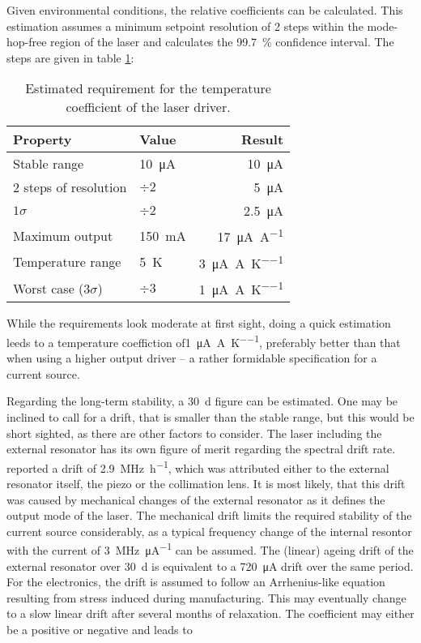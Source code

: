 Given environmental conditions, the relative coefficients can be calculated. This estimation assumes a minimum setpoint resolution of 2 steps within the mode-hop-free region of the laser and calculates the \qty{99.7}{\percent} confidence interval. The steps are given in table \ref{tab:dgdrive_tempco}:

\begin{table}[hb]
    \centering
    \begin{tabular}{llr}
        Property& Value& Result \\
        \midrule
        Stable range & \qty{10}{\uA}& \qty{10}{\uA}\\
        2 steps of resolution  & $\div 2$& \qty{5}{\uA} \\
        $1 \sigma$  & $\div 2$& \qty{2.5}{\uA} \\
        Maximum output& \qty{150}{\mA}& \qty{17}{\uA \per \A}\\
        Temperature range& \qty{5}{\K}& \qty{3}{\uA \per \A \per \K}\\
        Worst case ($3 \sigma$)& $\div 3$& \qty{1}{\uA \per \A \per \K}\\
    \end{tabular}
    \caption{Estimated requirement for the temperature coefficient of the laser driver.}
    \label{tab:dgdrive_tempco}
\end{table}

While the requirements look moderate at first sight, doing a quick estimation leeds to a temperature coeffiction of\qty[per-mode = symbol]{1}{\uA \per \A \per \K}, preferably better than that when using a higher output driver -- a rather formidable specification for a current source.

Regarding the long-term stability, a \qty{30}{\day} figure can be estimated. One may be inclined to call for a drift, that is smaller than the stable range, but this would be short sighted, as there are other factors to consider. The laser including the external resonator has its own figure of merit regarding the spectral drift rate. \citeauthor{ecdl_stability} \cite{ecdl_stability} reported a drift of \qty{2.9}{\MHz \per \hour}, which was attributed either to the external resonator itself, the piezo or the collimation lens. It is most likely, that this drift was caused by mechanical changes of the external resonator as it defines the output mode of the laser. The mechanical drift limits the required stability of the current source considerably, as a typical frequency change of the internal resontor with the current of \qty[per-mode=symbol]{3}{\MHz \per \micro \A} \cite{diodelaser_modulation} can be assumed. The (linear) ageing drift of the external resonator over \qty{30}{\day} is equivalent to a \qty{720}{\uA} drift over the same period. For the electronics, the drift is assumed to follow an Arrhenius-like equation resulting from stress induced during manufacturing. This may eventually change to a slow linear drift after several months of relaxation. The coefficient may either be a positive or negative and leads to

